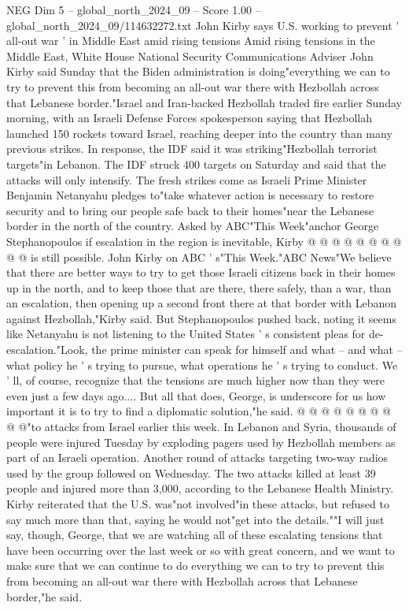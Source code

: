 \begin{textsample}{NEG Dim 5 – global\_north\_2024\_09 – Score 1.00 – global\_north\_2024\_09/114632272.txt}  \label{ex:f5_neg_097}
John Kirby says U.S. working to prevent ' all-out war ' in Middle East amid rising tensions Amid rising tensions in the Middle East, White House National Security Communications Adviser John Kirby said Sunday that the Biden administration is doing"everything we can to try to prevent this from becoming an all-out war there with Hezbollah across that Lebanese border."Israel and Iran-backed Hezbollah traded fire earlier Sunday morning, with an Israeli Defense Forces spokesperson saying that Hezbollah launched 150 rockets toward Israel, reaching deeper into the country than many previous strikes.
In response, the IDF said it was striking"Hezbollah terrorist targets"in Lebanon.
The IDF struck 400 targets on Saturday and said that the attacks will only intensify.
The fresh strikes come as Israeli Prime Minister Benjamin Netanyahu pledges to"take whatever action is necessary to restore security and to bring our people safe back to their homes"near the Lebanese border in the north of the country.
Asked by ABC"This Week"anchor George Stephanopoulos if escalation in the region is inevitable, Kirby @ @ @ @ @ @ @ @ @ @ is still possible.
John Kirby on ABC ' s"This Week."ABC News"We believe that there are better ways to try to get those Israeli citizens back in their homes up in the north, and to keep those that are there, there safely, than a war, than an escalation, then opening up a second front there at that border with Lebanon against Hezbollah,"Kirby said.
But Stephanopoulos pushed back, noting it seems like Netanyahu is not listening to the United States ' s consistent pleas for de-escalation."Look, the prime minister can speak for himself and what -- and what -- what policy he ' s trying to pursue, what operations he ' s trying to conduct.
We ' ll, of course, recognize that the tensions are much higher now than they were even just a few days ago....
But all that does, George, is underscore for us how important it is to try to find a diplomatic solution,"he said. @ @ @ @ @ @ @ @ @ @"to attacks from Israel earlier this week.
In Lebanon and Syria, thousands of people were injured Tuesday by exploding pagers used by Hezbollah members as part of an Israeli operation.
Another round of attacks targeting two-way radios used by the group followed on Wednesday.
The two attacks killed at least 39 people and injured more than 3,000, according to the Lebanese Health Ministry.
Kirby reiterated that the U.S. was"not involved"in these attacks, but refused to say much more than that, saying he would not"get into the details.""I will just say, though, George, that we are watching all of these escalating tensions that have been occurring over the last week or so with great concern, and we want to make sure that we can continue to do everything we can to try to prevent this from becoming an all-out war there with Hezbollah across that Lebanese border,"he said.

\end{textsample}
